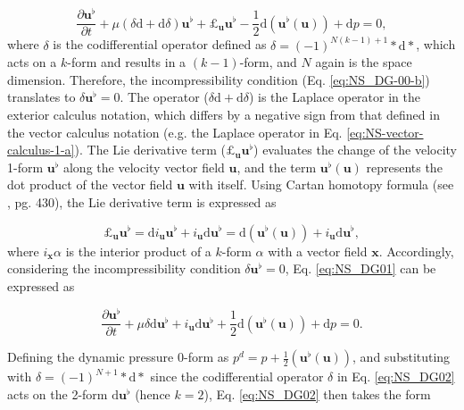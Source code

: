 \documentclass[final,12pt,times]{elsarticle}
\begin{document}
\begin{equation}
\label{eq:NS_DG01}
\frac{\partial \mathbf{u}^\flat}{\partial t} + \mu (\delta \textrm{d}+\textrm{d} \delta) \mathbf{u}^\flat + \pounds_{\mathbf{u}} \mathbf{u}^\flat - \frac{1}{2} \textrm{d} (\mathbf{u}^\flat(\mathbf{u}))  + \textrm{d}p =0,  
\end{equation}    
where $\delta$ is the codifferential operator defined as $\delta = (-1)^{N(k-1)+1} \ast \textrm{d} \ast$, which acts on a $k$-form and results in a $(k-1)$-form, and $N$ again is the space dimension. Therefore, the incompressibility condition (Eq. \eqref{eq:NS_DG-00-b}) translates to $\delta \mathbf{u}^\flat = 0$. The operator ($\delta \textrm{d}+\textrm{d} \delta$) is the Laplace operator in the exterior calculus notation, which differs by a negative sign from that defined in the vector calculus notation (e.g. the Laplace operator in Eq. \eqref{eq:NS-vector-calculus-1-a}). The Lie derivative term ($\pounds_{\mathbf{u}} \mathbf{u}^\flat$) evaluates the change of the velocity 1-form $\mathbf{u}^\flat$ along the velocity vector field $\mathbf{u}$, and the term $\mathbf{u}^\flat(\mathbf{u})$ represents the dot product of the vector field $\mathbf{u}$ with itself. Using Cartan homotopy formula (see \cite{AbMaRa1988}, pg. 430), the Lie derivative term is expressed as 

\begin{equation}
\label{eq:CartanHomotopy}
\pounds_{\mathbf{u}} \mathbf{u}^\flat = \textrm{d} i_{\mathbf{u}} \mathbf{u}^\flat + i_{\mathbf{u}} \textrm{d} \mathbf{u}^\flat = \textrm{d}(\mathbf{u}^\flat(\mathbf{u})) + i_{\mathbf{u}} \textrm{d} \mathbf{u}^\flat,  
\end{equation}
where $i_{\mathbf{x}} \alpha$ is the interior product of a $k$-form $\alpha$ with a vector field $\mathbf{x}$. Accordingly, considering the incompressibility condition $\delta \mathbf{u}^\flat = 0$, Eq. \eqref{eq:NS_DG01} can be expressed as

\begin{equation}
\label{eq:NS_DG02}
\frac{\partial \mathbf{u}^\flat}{\partial t} + \mu \delta \textrm{d} \mathbf{u}^\flat + i_{\mathbf{u}} \textrm{d} \mathbf{u}^\flat + \frac{1}{2} \textrm{d} (\mathbf{u}^\flat(\mathbf{u}))  + \textrm{d}p =0.  
\end{equation}

Defining the dynamic pressure 0-form as $p^d = p + \frac{1}{2} (\mathbf{u}^\flat(\mathbf{u}))$, and substituting with $\delta = (-1)^{N+1} \ast \textrm{d} \ast$ since the codifferential operator $\delta$ in Eq. \eqref{eq:NS_DG02} acts on the 2-form $\textrm{d} \mathbf{u}^\flat$ (hence $k=2$), Eq. \eqref{eq:NS_DG02} then takes the form
 
\end{document}
